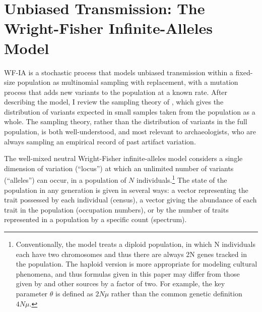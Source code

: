 \section{Unbiased Transmission:  The Wright-Fisher Infinite-Alleles Model}
\label{ta:sec:wf-model}

WF-IA is a stochastic process that models unbiased transmission within a fixed-size population as multinomial sampling with replacement, with a mutation process that adds new variants to the population at a known rate.  After describing the model, I review the sampling theory of \citet{ewens1972sampling}, which gives the distribution of variants expected in small samples taken from the population as a whole.  The sampling theory, rather than the distribution of variants in the full population, is both well-understood, and most relevant to archaeologists, who are always sampling an empirical record of past artifact variation.

The well-mixed neutral Wright-Fisher infinite-alleles model \citep{kimura1964number} considers a single dimension of variation (``locus'') at which an unlimited number of variants (``alleles'') can occur, in a population of $N$ individuals.\footnote{Conventionally, the model treats a diploid population, in which N individuals each have two chromosomes and thus there are always 2N genes tracked in the population.  The haploid version is more appropriate for modeling cultural phenomena, and thus formulas given in this paper may differ from those given by \citet{Ewens2004} and other sources by a factor of two.  For example, the key parameter $\theta$ is defined as $2N\mu$ rather than the common genetic definition $4N\mu$.}  The state of the population in any generation is given in several ways:  a vector representing the trait possessed by each individual (census), a vector giving the abundance of each trait in the population (occupation numbers), or by the number of traits represented in a population by a specific count (spectrum).  

